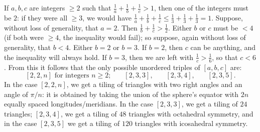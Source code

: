 \documentclass[leqno]{book}
\begin{document}
If $a,b,c$ are integers $\geqslant 2$ such that $\frac 1a+\frac 1b+\frac 1c>1$, then one of the integers must be $2$: if they were all $\geqslant 3$, we would have $\frac 1a+\frac 1b+\frac 1c\leqslant\frac 13+\frac 13+\frac 13=1$.  Suppose, without loss of generality, that $a=2$.  Then $\frac 1b+\frac 1c>\frac 12$.  Either $b$ or $c$ must be $<4$ (if both were $\geqslant 4$, the inequality would fail); so suppose, again without loss of generality, that $b<4$.  Either $b=2$ or $b=3$.  If $b=2$, then $c$ can be anything, and the inequality will always hold.  If $b=3$, then we are left with $\frac 1c>\frac 16$, so that $c<6$.  From this it follows that the only possible unordered triples of $[a,b,c]$ are:
$$[2,2,n]\text{ for integers }n\geqslant 2;~~~~~~~~[2,3,3],~~~~~~~~[2,3,4],~~~~~~~~[2,3,5].$$
In the case $[2,2,n]$, we get a tiling of triangles with two right angles and an angle of $\pi/n$: it is obtained by taking the union of the sphere's equator with $2n$ equally spaced longitudes/meridians.  In the case $[2,3,3]$, we get a tiling of $24$ triangles; $[2,3,4]$, we get a tiling of $48$ triangles with octahedral symmetry, and in the case $[2,3,5]$ we get a tiling of $120$ triangles with icosahedral symmetry.
\end{document}
